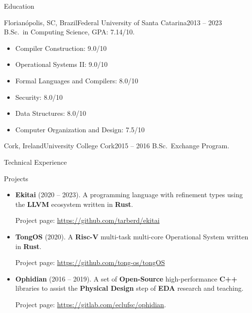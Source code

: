 \documentclass[calibri]{mcdowellcv}
\begin{document}
	\begin{cvsection}{Education}
		\begin{cvsubsection}{Florianópolis, SC, Brazil}{Federal University of Santa Catarina}{2013 -- 2023}
			B.Sc.\ in Computing Science, GPA\@: 7.14/10.
			\begin{multicols}{2}
				\begin{itemize}
						\item Compiler Construction: 9.0/10
						\item Operational Systems II\@: 9.0/10
						\item Formal Languages and Compilers: 8.0/10
						\item Security: 8.0/10
						\item Data Structures: 8.0/10
						\item Computer Organization and Design: 7.5/10
				\end{itemize}
		  \end{multicols}
  	\end{cvsubsection}
		\begin{cvsubsection}{Cork, Ireland}{University College Cork}{2015 -- 2016}
			B.Sc.\ Exchange Program.
  	\end{cvsubsection}
	\end{cvsection}

	\begin{cvsection}{Technical Experience}
		\begin{cvsubsection}{Projects}{}{}
			\begin{itemize}
				\item \textbf{Ekitai} (2020 -- 2023). A programming language with refinement types using the \textbf{LLVM} ecosystem written in \textbf{Rust}.

				Project page: \url{https://github.com/tarberd/ekitai}

				\item \textbf{TongOS} (2020). A \textbf{Risc-V} multi-task multi-core Operational System written in \textbf{Rust}.

				Project page: \url{https://github.com/tong-os/tongOS}

				\item \textbf{Ophidian} (2016 -- 2019). A set of \textbf{Open-Source} high-performance \textbf{C++} libraries to assist the \textbf{Physical Design} step of \textbf{EDA} research and teaching.

				Project page: \url{https://gitlab.com/eclufsc/ophidian}.
			\end{itemize}
		\end{cvsubsection}
	\end{cvsection}
\end{document}
